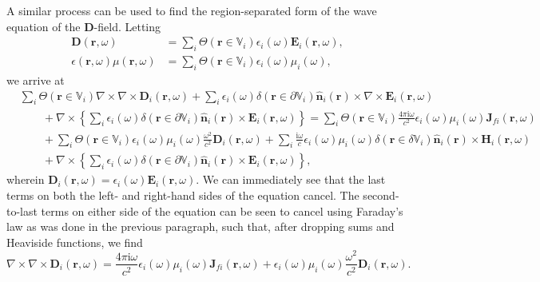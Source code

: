 \documentclass{article}
\begin{document}
A similar process can be used to find the region-separated form of the wave equation of the $\mathbf{D}$-field. Letting
\begin{equation}
\begin{split}
\mathbf{D}(\mathbf{r},\omega) &= \sum_i\Theta(\mathbf{r}\in\mathbb{V}_i)\epsilon_i(\omega)\mathbf{E}_i(\mathbf{r},\omega),\\
\epsilon(\mathbf{r},\omega)\mu(\mathbf{r},\omega) &= \sum_i\Theta(\mathbf{r}\in\mathbb{V}_i)\epsilon_i(\omega)\mu_i(\omega),
\end{split}
\end{equation}
we arrive at
\begin{equation}
\begin{split}
&\sum_i\Theta(\mathbf{r}\in\mathbb{V}_i)\nabla\times\nabla\times\mathbf{D}_i(\mathbf{r},\omega) + \sum_i\epsilon_i(\omega)\delta(\mathbf{r}\in\partial\mathbb{V}_i)\hat{\mathbf{n}}_i(\mathbf{r})\times\nabla\times\mathbf{E}_i(\mathbf{r},\omega)\\
&\qquad + \nabla\times\left\{\sum_i\epsilon_i(\omega)\delta(\mathbf{r}\in\partial\mathbb{V}_i)\hat{\mathbf{n}}_i(\mathbf{r})\times\mathbf{E}_i(\mathbf{r},\omega)\right\} = \sum_i\Theta(\mathbf{r}\in\mathbb{V}_i)\frac{4\pi\mathrm{i}\omega}{c^2}\epsilon_i(\omega)\mu_i(\omega)\mathbf{J}_{fi}(\mathbf{r},\omega)\\
&\qquad + \sum_i\Theta(\mathbf{r}\in\mathbb{V}_i)\epsilon_i(\omega)\mu_i(\omega)\frac{\omega^2}{c^2}\mathbf{D}_i(\mathbf{r},\omega) + \sum_i\frac{\mathrm{i}\omega}{c}\epsilon_i(\omega)\mu_i(\omega)\delta(\mathbf{r}\in\delta\mathbb{V}_i)\hat{\mathbf{n}}_i(\mathbf{r})\times\mathbf{H}_i(\mathbf{r},\omega)\\
&\qquad + \nabla\times\left\{\sum_i\epsilon_i(\omega)\delta(\mathbf{r}\in\partial\mathbb{V}_i)\hat{\mathbf{n}}_i(\mathbf{r})\times\mathbf{E}_i(\mathbf{r},\omega)\right\},
\end{split}
\end{equation}
wherein $\mathbf{D}_i(\mathbf{r},\omega) = \epsilon_i(\omega)\mathbf{E}_i(\mathbf{r},\omega)$. We can immediately see that the last terms on both the left- and right-hand sides of the equation cancel. The second-to-last terms on either side of the equation can be seen to cancel using Faraday's law as was done in the previous paragraph, such that, after dropping sums and Heaviside functions, we find
\begin{equation}\label{eq:waveEqDseparated2}
\nabla\times\nabla\times\mathbf{D}_i(\mathbf{r},\omega) = \frac{4\pi\mathrm{i}\omega}{c^2}\epsilon_i(\omega)\mu_i(\omega)\mathbf{J}_{fi}(\mathbf{r},\omega) + \epsilon_i(\omega)\mu_i(\omega)\frac{\omega^2}{c^2}\mathbf{D}_i(\mathbf{r},\omega).
\end{equation}
\end{document}
